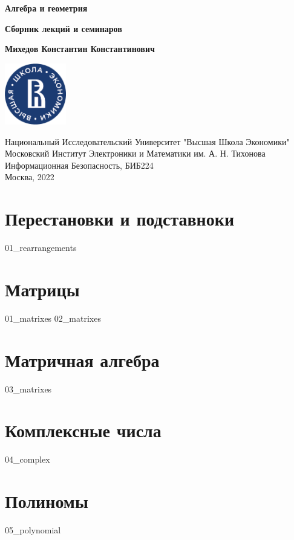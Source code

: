 \documentclass[a4paper,12pt]{article}
\begin{document}
  \begin{titlepage}
    \begin{center}
      \vspace*{1.5cm}

      \Huge
      \textbf{Алгебра и геометрия}

      \vspace{0.5cm} \large
      \textbf{Сборник лекций и семинаров}

      \vspace{1.5cm} \normalsize
      \textbf{Михедов Константин Константинович}

      \vfill

      \includegraphics[width=0.2\textwidth]{hse_logo}

      \vspace{1cm} \footnotesize
      Национальный Исследовательский Университет "Высшая Школа Экономики" \\
      Московский Институт Электроники и Математики им. А. Н. Тихонова \\
      Информационная Безопасность, БИБ224 \\
      Москва, 2022
    \end{center}
  \end{titlepage}

  \section{Перестановки и подставноки}
  {01_rearrangements}

  \section{Матрицы}
  {01_matrixes}
  {02_matrixes}

  \section{Матричная алгебра}
  {03_matrixes}

  \section{Комплексные числа}
  {04_complex}

  \section{Полиномы}
  {05_polynomial}
\end{document}
